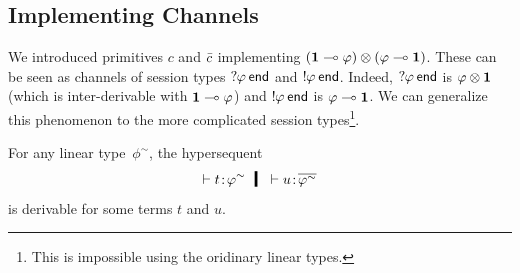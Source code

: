     \subsection{Implementing Channels}
    We introduced primitives $c$ and $\bar{c}$ implementing
    $(\mathbf{1}\multimap\varphi)\otimes(\varphi\multimap\mathbf{1})$.
    These can be seen as channels of session types
    $\mathop{?}\kern -2pt{\varphi}\hskip 2pt{\mathsf{end}}$ and $\mathop{!}\kern -2pt{\varphi}\hskip 2pt{\mathsf{end}}$.
    Indeed, $\mathop{?}\kern -2pt{\varphi}\hskip 2pt{\mathsf{end}}$ is $\varphi\otimes\mathbf{1}$ (which is
    inter-derivable with $\mathbf{1}\multimap\varphi$) and $\mathop{!}\kern -2pt{\varphi}\hskip 2pt{\mathsf{end}}$ is
    $\varphi\multimap \mathbf{1}$.
    We can generalize this phenomenon to the more complicated session
    types\footnote{This is impossible using the oridinary linear types.}.
     \begin{proposition}
      For any linear type~$\phi^\sim$\kern -2pt, the hypersequent
      \[
       \tr\tj{t}{\phi^\sim}\hmid \tr\tj{u}{\overline{\phi^\sim}}
      \]
      is derivable for some terms $t$ and $u$.
     \end{proposition}
